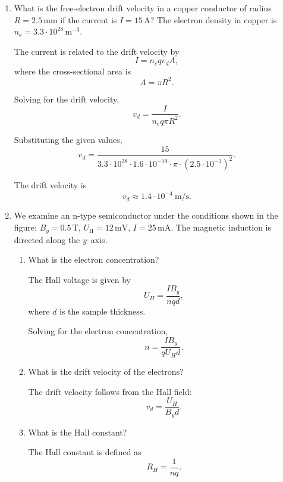 \documentclass[a4paper,12pt]{letter}
\begin{document}
\begin{enumerate}
\bigskip


\pagebreak
  \item What is the free-electron drift velocity in a copper conductor of radius $R = 2.5\,\text{mm}$ if the current is $I = 15\,\text{A}$?  
  The electron density in copper is $n_{\text{e}} = 3.3 \cdot 10^{28}\,\text{m}^{-3}$.

\medskip

The current is related to the drift velocity by $$I = n_e q v_d A, $$ where the cross-sectional area is $$A = \pi R^2.$$

Solving for the drift velocity, $$v_d = \frac{I}{n_e q \pi R^2}.$$

Substituting the given values,$$v_d =\frac{15}{3.3 \cdot 10^{28} \cdot 1.6 \cdot 10^{-19}\cdot \pi \cdot (2.5 \cdot 10^{-3})^2}.$$

The drift velocity is $$v_d \approx 1.4 \cdot 10^{-4}\ \mathrm{m/s}.$$

\bigskip

\item We examine an n-type semiconductor under the conditions shown in the figure:  $B_{y} = 0.5\,\text{T}$, $U_{\text{H}} = 12\,\text{mV}$, $I = 25\,\text{mA}$.  The magnetic induction is directed along the $y$–axis.


  \begin{enumerate}
  \item What is the electron concentration?

  \medskip

The Hall voltage is given by $$U_H = \frac{I B_y}{n q d}, $$ where $d$ is the sample thickness.

Solving for the electron concentration, $$n = \frac{I B_y}{q U_H d}.$$

\medskip


\item What is the drift velocity of the electrons?

  \medskip

The drift velocity follows from the Hall field: $$ v_d = \frac{U_H}{B_y d}.$$

\medskip


\item What is the Hall constant?

  \medskip

The Hall constant is defined as $$ R_H = \frac{1}{n q}.$$

  
\end{enumerate}

\end{enumerate}



\bigskip


\vfill
\end{document}

